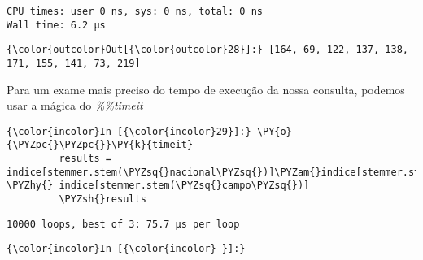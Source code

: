     \begin{Verbatim}[commandchars=\\\{\}]
CPU times: user 0 ns, sys: 0 ns, total: 0 ns
Wall time: 6.2 µs

    \end{Verbatim}

            \begin{Verbatim}[commandchars=\\\{\}]
{\color{outcolor}Out[{\color{outcolor}28}]:} [164, 69, 122, 137, 138, 171, 155, 141, 73, 219]
\end{Verbatim}
        
    Para um exame mais preciso do tempo de execução da nossa consulta,
podemos usar a mágica do \emph{\%\%timeit}

    \begin{Verbatim}[commandchars=\\\{\}]
{\color{incolor}In [{\color{incolor}29}]:} \PY{o}{\PYZpc{}\PYZpc{}}\PY{k}{timeit}
         results = indice[stemmer.stem(\PYZsq{}nacional\PYZsq{})]\PYZam{}indice[stemmer.stem(\PYZsq{}perdi\PYZsq{})] \PYZhy{} indice[stemmer.stem(\PYZsq{}campo\PYZsq{})]
         \PYZsh{}results
\end{Verbatim}

    \begin{Verbatim}[commandchars=\\\{\}]
10000 loops, best of 3: 75.7 µs per loop

    \end{Verbatim}

    \begin{Verbatim}[commandchars=\\\{\}]
{\color{incolor}In [{\color{incolor} }]:} 
\end{Verbatim}


    
    
    
    
